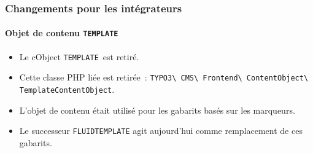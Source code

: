 %

\begin{frame}[fragile]
	\frametitle{Changements pour les intégrateurs}
	\framesubtitle{Objet de contenu \small\texttt{TEMPLATE}\normalsize}


	\begin{itemize}
		\item Le cObject \small\texttt{TEMPLATE}\normalsize~est retiré.
		\item Cette classe PHP liée est retirée~:\newline
			\smaller\texttt{TYPO3\textbackslash
				CMS\textbackslash
				Frontend\textbackslash
				ContentObject\textbackslash
				TemplateContentObject}.\normalsize
		\item L'objet de contenu était utilisé pour les gabarits basés sur les marqueurs.
		\item Le successeur
			\small\texttt{FLUIDTEMPLATE}\normalsize
			\tabto{4.8cm}agit aujourd'hui comme remplacement de ces gabarits.
	\end{itemize}
\end{frame}

